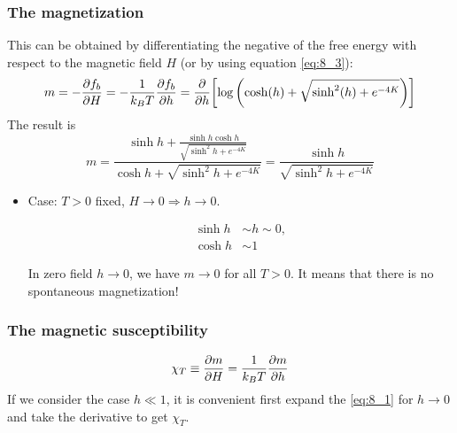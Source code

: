 \documentclass[../main/main.tex]{subfiles}
\begin{document}
\subsubsection{The magnetization}
This can be obtained by differentiating the negative of the free energy with respect to the magnetic field \( H \) (or by using equation \eqref{eq:8_3}):
\begin{equation*}
  m = - \pdv{f_b}{H} = - \frac{1}{k_B T } \pdv{f_b}{h} = \pdv{}{h} \qty[  \log{\qty( \cosh(h)+\sqrt{\sinh^2(h)+e^{-4K}  } )} ]
\end{equation*}
The result is
\begin{equation}
  m =   \frac{\sinh h + \frac{ \sinh h \cosh h}{\sqrt{\sinh^2 h + e^{-4K} }} }{\cosh h + \sqrt{\sinh^2 h + e^{-4K} } } 
  = \frac{\sinh h  }{\sqrt{\sinh^2 h + e^{-4K} } }
  \label{eq:8_1}
\end{equation}
\begin{itemize}
\item Case: \( T>0 \) fixed, \( H \rightarrow 0 \Rightarrow h \rightarrow 0\).
\begin{subequations*}
\begin{align*}
  \sinh h & \sim h \sim 0, \\ \cosh h &\sim 1
\end{align*}
\end{subequations*}
In zero field \( h \rightarrow 0 \), we have \( m \rightarrow 0 \) for all \( T>0 \). It means that there is no spontaneous magnetization!
\end{itemize}


\subsubsection{The magnetic susceptibility}
\begin{equation}
  \chi_T  \equiv  \pdv{m}{H} = \frac{1}{k_B T} \pdv{m}{h}
\end{equation}
If we consider the case \( h \ll 1 \), it is convenient first expand the  \eqref{eq:8_1} for \( h \rightarrow 0 \) and take the derivative to get \( \chi _T \).
\end{document}
